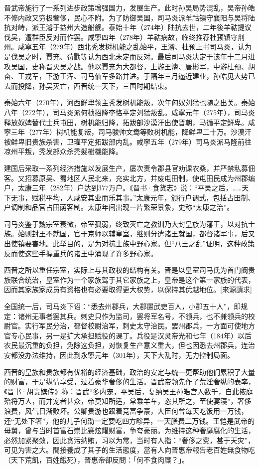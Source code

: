 晋武帝施行了一系列进步政策增强国力，发展生产。此时孙吴局势混乱，吴帝孙皓不修内政又穷极奢侈，民心不附。为了防御吴国，司马炎派羊祜镇守襄阳与吴将陆抗对峙，派王濬于益州大造船舰。泰始十年（274年）陆抗去世，二年後羊祜提议伐吴，遭群臣反对而作罢。咸寧四年（278年）羊祜病故，临终推荐杜预镇守荆州。咸寧五年（279年）西北秃发树机能之乱始平，王濬、杜预上书司马炎，认为是伐吴之时，賈充、荀勖等认为西北未定而反对。最后司马炎决定于该年十二月进攻吴国，史称晋灭吴之战。他以賈充为大都督，上游王濬、唐彬军，中游杜预、胡奋、王戎军，下游王浑、司马伷军多路并进。于隔年三月逼近建业，孙皓见大势已去而投降，孙吴灭亡，西晋统一天下，三国时期结束。

泰始六年（270年），河西鲜卑领主秃发树机能叛，次年匈奴刘猛也随之出关。泰始八年（272年），司马炎派何桢招降李恪平定刘猛叛乱。咸寧元年（275年），司马炎释放奴婢替代士兵屯田，树机能归降，拓跋部沙漠汗出使晋朝，马循平定鲜卑。咸寧三年（277年）树机能复叛，司马骏帅文鸯等败树机能，降鲜卑二十万。沙漠汗被鲜卑旧贵族杀害，卫瓘平定拓跋部内乱。咸寧五年（279年）司马炎派马隆前往凉州平叛，秃发部众杀禿髮樹機能降。

建国后采取一系列经济措施以发展生产，屡次责令郡县官劝课农桑，并严禁私募佃客。又招募原吴、蜀地区人民北来，充实北方，并废屯田制，使屯田民成为州郡编户，太康三年（282年）户达到377万户。《晋书·食货志》说：“平吴之后，……天下无事，赋税平均，人咸安其业而乐其事。”太康元年，颁行户调式，包括占田制、户调制和品官占田荫客制。太康年间出现一片繁荣景象，史称“太康之治”。

司马炎鉴于魏宗室衰微，帝室孤弱，终致灭亡之教训乃大封皇族为藩王，以对抗士族。始则封王不就国，官于京师以辅皇室，继则分遣诸王就国，都督诸军事，后又出使镇要害地。此举目的，是为对抗士族中野心家。但“八王之乱”证明，这种政策反而使这些手握重兵的诸王中涌现了许多野心家。

西晋之所以重任宗室，实际上与其政权的结构有关。晋是以皇室司马氏为首门阀贵族联合统治，皇室作为一个家族驾于其它家族之上，皇帝是这个第一家族的代表，因而其家族家成员有资格也有必要取得更大权势，以保持其优越地位。[來源請求]

全国统一后，司马炎下诏：“悉去州郡兵，大郡置武吏百人，小郡五十人”，即规定：诸州无事者罢其兵。刺史只作为监司，罢将军名号，不领兵，也不兼领兵的校尉官。实行军民分治，都督校尉治军，刺史太守治民。罢州郡兵，一方面可使地方官专心民事，另一是扩大承担赋役的课丁。兵役是汉灵帝光和七年（184年）以后农民最沉重的负担，免除这负担，对恢复生产意义重大，但也因悉去州郡兵，连治安都没办法维持，因此到永寧元年（301年），天下大乱时，无力控制局面。

西晋的皇族和贵族都有优裕的经济基础，政治的安定与统一更帮助他们累积了大量的财富，于是纵情享受，过着豪华奢侈的生活。晋武帝领先作了荒淫奢纵的表率，《晋书·胡贵嫔传》称：晋武“多内宠，平吴后，复纳吴王孙皓宫人数千，自此掖庭殆将万人，而并宠者甚众，帝莫知所适，常乘羊车，恣其所之，至使宴寝”，奢侈浪费，风气日渐败坏。公卿贵游也跟着竞富争豪，大臣何曾每天吃饭用一万钱，还“无处下箸”，他的儿子何劭一定要吃四方畛异，一天膳费二万钱。王恺是武帝的母舅，曾与当时首富石崇比赛炫耀财富，争夸豪丽。为维持这种奢靡腐化的生活，必然加紧聚敛，因此贪污纳贿，习以为常，当时有人指：“奢侈之费，甚于天灾”，可见为害之大。間接養成了其子的生活態度，當有人向晉惠帝報告老百姓無食物吃（天下荒飢，百姓餓死），晉惠帝卻反問：「何不食肉糜？」。

